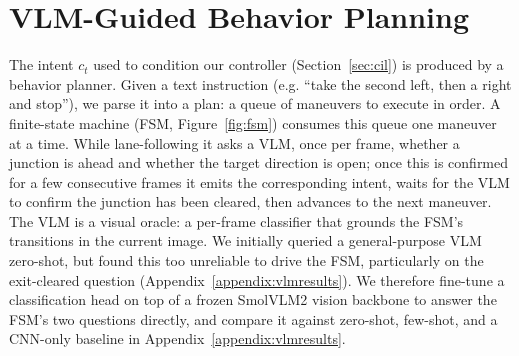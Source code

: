 \section{VLM-Guided Behavior Planning}
\label{sec:vlm}

The intent $c_t$ used to condition our controller (Section~\ref{sec:cil}) is produced by a behavior planner.
Given a text instruction (e.g. ``take the second left, then a right and stop''), we parse it into a plan: a queue of maneuvers to execute in order.
A finite-state machine (FSM, Figure~\ref{fig:fsm}) consumes this queue one maneuver at a time.
While lane-following it asks a VLM, once per frame, whether a junction is ahead and whether the target direction is open; once this is confirmed for a few consecutive frames it emits the corresponding intent, waits for the VLM to confirm the junction has been cleared, then advances to the next maneuver.
The VLM is a visual oracle: a per-frame classifier that grounds the FSM's transitions in the current image.
We initially queried a general-purpose VLM zero-shot, but found this too unreliable to drive the FSM, particularly on the exit-cleared question (Appendix~\ref{appendix:vlmresults}).
We therefore fine-tune a classification head on top of a frozen SmolVLM2 \cite{marafioti2025smolvlm} vision backbone to answer the FSM's two questions directly, and compare it against zero-shot, few-shot, and a CNN-only baseline in Appendix~\ref{appendix:vlmresults}.


